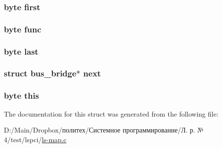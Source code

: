 \subsubsection[{\texorpdfstring{first}{first}}]{\setlength{\rightskip}{0pt plus 5cm}byte first}\hypertarget{structbus__bridge_aa74a3e3a9dfdf50ee733d1aa1d7c0ef2}{}\label{structbus__bridge_aa74a3e3a9dfdf50ee733d1aa1d7c0ef2}
\subsubsection[{\texorpdfstring{func}{func}}]{\setlength{\rightskip}{0pt plus 5cm}byte func}\hypertarget{structbus__bridge_ab852817e2b425f96ac8229168e797b33}{}\label{structbus__bridge_ab852817e2b425f96ac8229168e797b33}
\subsubsection[{\texorpdfstring{last}{last}}]{\setlength{\rightskip}{0pt plus 5cm}byte last}\hypertarget{structbus__bridge_aea7e8e5343ab38df0625275451f409d7}{}\label{structbus__bridge_aea7e8e5343ab38df0625275451f409d7}
\subsubsection[{\texorpdfstring{next}{next}}]{\setlength{\rightskip}{0pt plus 5cm}struct {\bf bus\+\_\+bridge}$\ast$ next}\hypertarget{structbus__bridge_a65c13bde9be998c616b02a2dcdd2ee05}{}\label{structbus__bridge_a65c13bde9be998c616b02a2dcdd2ee05}
\subsubsection[{\texorpdfstring{this}{this}}]{\setlength{\rightskip}{0pt plus 5cm}byte this}\hypertarget{structbus__bridge_a2830d81e1dca5d773cdda5e9e1aa94e9}{}\label{structbus__bridge_a2830d81e1dca5d773cdda5e9e1aa94e9}


The documentation for this struct was generated from the following file\+:\begin{DoxyCompactItemize}
\item 
D\+:/\+Main/\+Dropbox/политех/Системное программирование/Л. р. № 4/test/lspci/\hyperlink{ls-map_8c}{ls-\/map.\+c}\end{DoxyCompactItemize}
